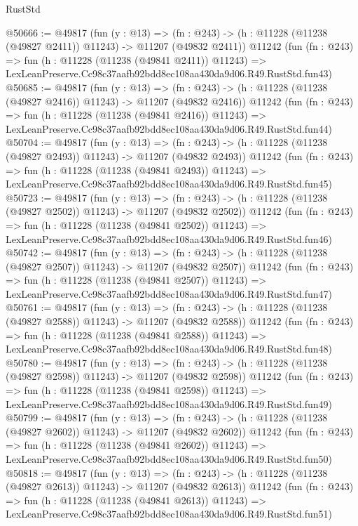 \begin{lexlean}{RustStd}
\begin{coremodule}
@50666 := @49817
    (fun (y : @13) =>
    (fn : @243) -> (h : @11228 (@11238 (@49827 @2411)) @11243) -> @11207 (@49832 @2411))
    @11242
    (fun (fn : @243) =>
    fun (h : @11228 (@11238 (@49841 @2411)) @11243) =>
    LexLeanPreserve.Cc98c37aafb92bdd8ec108aa430da9d06.R49.RustStd.fun43)
@50685 := @49817
    (fun (y : @13) =>
    (fn : @243) -> (h : @11228 (@11238 (@49827 @2416)) @11243) -> @11207 (@49832 @2416))
    @11242
    (fun (fn : @243) =>
    fun (h : @11228 (@11238 (@49841 @2416)) @11243) =>
    LexLeanPreserve.Cc98c37aafb92bdd8ec108aa430da9d06.R49.RustStd.fun44)
@50704 := @49817
    (fun (y : @13) =>
    (fn : @243) -> (h : @11228 (@11238 (@49827 @2493)) @11243) -> @11207 (@49832 @2493))
    @11242
    (fun (fn : @243) =>
    fun (h : @11228 (@11238 (@49841 @2493)) @11243) =>
    LexLeanPreserve.Cc98c37aafb92bdd8ec108aa430da9d06.R49.RustStd.fun45)
@50723 := @49817
    (fun (y : @13) =>
    (fn : @243) -> (h : @11228 (@11238 (@49827 @2502)) @11243) -> @11207 (@49832 @2502))
    @11242
    (fun (fn : @243) =>
    fun (h : @11228 (@11238 (@49841 @2502)) @11243) =>
    LexLeanPreserve.Cc98c37aafb92bdd8ec108aa430da9d06.R49.RustStd.fun46)
@50742 := @49817
    (fun (y : @13) =>
    (fn : @243) -> (h : @11228 (@11238 (@49827 @2507)) @11243) -> @11207 (@49832 @2507))
    @11242
    (fun (fn : @243) =>
    fun (h : @11228 (@11238 (@49841 @2507)) @11243) =>
    LexLeanPreserve.Cc98c37aafb92bdd8ec108aa430da9d06.R49.RustStd.fun47)
@50761 := @49817
    (fun (y : @13) =>
    (fn : @243) -> (h : @11228 (@11238 (@49827 @2588)) @11243) -> @11207 (@49832 @2588))
    @11242
    (fun (fn : @243) =>
    fun (h : @11228 (@11238 (@49841 @2588)) @11243) =>
    LexLeanPreserve.Cc98c37aafb92bdd8ec108aa430da9d06.R49.RustStd.fun48)
@50780 := @49817
    (fun (y : @13) =>
    (fn : @243) -> (h : @11228 (@11238 (@49827 @2598)) @11243) -> @11207 (@49832 @2598))
    @11242
    (fun (fn : @243) =>
    fun (h : @11228 (@11238 (@49841 @2598)) @11243) =>
    LexLeanPreserve.Cc98c37aafb92bdd8ec108aa430da9d06.R49.RustStd.fun49)
@50799 := @49817
    (fun (y : @13) =>
    (fn : @243) -> (h : @11228 (@11238 (@49827 @2602)) @11243) -> @11207 (@49832 @2602))
    @11242
    (fun (fn : @243) =>
    fun (h : @11228 (@11238 (@49841 @2602)) @11243) =>
    LexLeanPreserve.Cc98c37aafb92bdd8ec108aa430da9d06.R49.RustStd.fun50)
@50818 := @49817
    (fun (y : @13) =>
    (fn : @243) -> (h : @11228 (@11238 (@49827 @2613)) @11243) -> @11207 (@49832 @2613))
    @11242
    (fun (fn : @243) =>
    fun (h : @11228 (@11238 (@49841 @2613)) @11243) =>
    LexLeanPreserve.Cc98c37aafb92bdd8ec108aa430da9d06.R49.RustStd.fun51)

\end{coremodule}
\end{lexlean}
